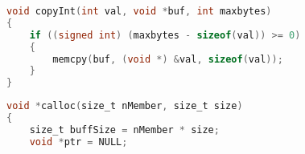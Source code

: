 {\begin{practicec}
    \end{practicec}

    \begin{practicec}

    \end{practicec}

    \begin{practicec}

    \end{practicec}

    \begin{practicec}

    \end{practicec}

    \begin{practicec}

    \end{practicec}

    \begin{practicec}

    \end{practicec}

    \begin{practicec}
        \begin{codelist}
            \begin{lstlisting}[language=C]
void copyInt(int val, void *buf, int maxbytes)
{
    if ((signed int) (maxbytes - sizeof(val)) >= 0)
    {
        memcpy(buf, (void *) &val, sizeof(val));
    }
}
            \end{lstlisting}
        \end{codelist}
    \end{practicec}

    \begin{practicec}

    \end{practicec}

    \begin{practicec}

    \end{practicec}

    \begin{practicec}

    \end{practicec}

    \begin{practicec}
        \begin{codelist}
            \begin{lstlisting}[language=C]
void *calloc(size_t nMember, size_t size)
{
    size_t buffSize = nMember * size;
    void *ptr = NULL;


\end{lstlisting}
\end{codelist}
\end{practicec}}
